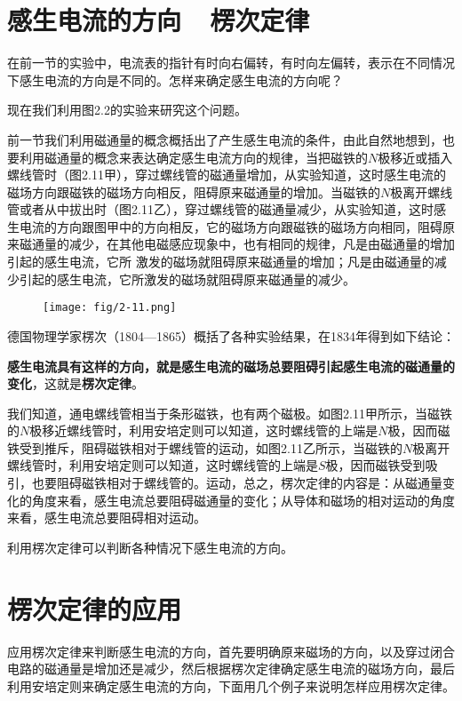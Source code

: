 \section{感生电流的方向~~楞次定律}
在前一节的实验中，电流表的指针有时向右偏转，有时向左偏转，表示在不同情况下感生电流的方向是不同的。怎样来确定感生电流的方向呢？

现在我们利用图2.2的实验来研究这个问题。

前一节我们利用磁通量的概念概括出了产生感生电流的条件，由此自然地想到，也要利用磁通量的概念来表达确定感生电流方向的规律，当把磁铁的$N$极移近或插入螺线管时（图2.11甲），穿过螺线管的磁通量增加，从实验知道，这时感生电流的磁场方向跟磁铁的磁场方向相反，阻碍原来磁通量的增加。当磁铁的$N$极离开螺线管或者从中拔出时（图2.11乙），穿过螺线管的磁通量减少，从实验知道，这时感生电流的方向跟图甲中的方向相反，它的磁场方向跟磁铁的磁场方向相同，阻碍原来磁通量的减少，在其他电磁感应现象中，也有相同的规律，凡是由磁通量的增加引起的感生电流，它所
激发的磁场就阻碍原来磁通量的增加；凡是由磁通量的减少引起的感生电流，它所激发的磁场就阻碍原来磁通量的减少。
\begin{figure}[htp]\centering
\texttt{[image: fig/2-11.png]}
\caption{}
\end{figure}

德国物理学家楞次（1804—1865）概括了各种实验结果，在1834年得到如下结论：

\textbf{感生电流具有这样的方向，就是感生电流的磁场总要阻碍引起感生电流的磁通量的变化}，这就是\textbf{楞次定律}。

我们知道，通电螺线管相当于条形磁铁，也有两个磁极。如图2.11甲所示，当磁铁的$N$极移近螺线管时，利用安培定则可以知道，这时螺线管的上端是$N$极，因而磁铁受到推斥，阻碍磁铁相对于螺线管的运动，如图2.11乙所示，当磁铁的$N$极离开螺线管时，利用安培定则可以知道，这时螺线管的上端是$S$极，因而磁铁受到吸引，也要阻碍磁铁相对于螺线管的。运动，总之，楞次定律的内容是：从磁通量变化的角度来看，感生电流总要阻碍磁通量的变化；从导体和磁场的相对运动的角度来看，感生电流总要阻碍相对运动。

利用楞次定律可以判断各种情况下感生电流的方向。

\section{楞次定律的应用}
应用楞次定律来判断感生电流的方向，首先要明确原来磁场的方向，以及穿过闭合电路的磁通量是增加还是减少，然后根据楞次定律确定感生电流的磁场方向，最后利用安培定则来确定感生电流的方向，下面用几个例子来说明怎样应用楞次定律。

